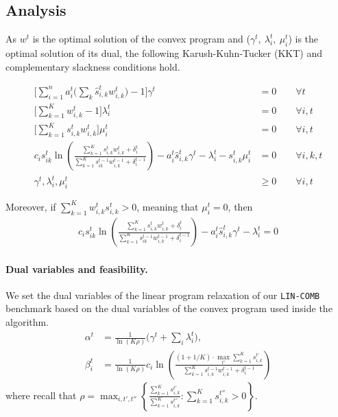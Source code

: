 \subsection{Analysis}
As $w^{t}$ is the optimal solution of the convex program and ($\gamma^t,\ \lambda_{i}^{t},\ \mu_{i}^{t}$) is the optimal solution of its dual, the following Karush-Kuhn-Tucker (KKT) and complementary slackness conditions hold.

\begin{align*}
   \biggl[ \sum_{i=1}^{n} a_{i}^{t} \biggl( \sum_{k}  \hat{s}_{i,k}^{t} w_{i,k}^{t} \biggr) - 1 \biggr] \gamma^{t} &= 0 \qquad \forall t \\
   \biggl[ \sum_{k=1}^{K}  w_{i,k}^{t}  - 1 \biggr] \lambda_{i}^{t} &= 0 \qquad \forall i, t \\
   \biggl[ \sum_{k=1}^{K}  s_{i,k}^{t} w_{i,k}^{t} \biggr] \mu_{i}^{t} &= 0 \qquad \forall i, t \\
%
 c_{i} s_{ik}^{t} \ln \left( \frac{\sum_{k=1}^{K} s_{i,k}^{t} w_{i,k}^{t} + \delta_{i}^{t}}{\sum_{k=1}^{K}  s_{ik}^{t-1}w_{i,k}^{t-1}  + \delta_{i}^{t-1}} \right)
    	- a_{i}^{t} \hat{s}_{i,k}^{t} \gamma^{t} - \lambda_{i}^{t} - s_{i,k}^{t} \mu_{i}^{t} &= 0	\qquad \forall i,k,t \\
	\gamma^{t}, \lambda_{i}^{t}, \mu_{i}^{t} &\geq 0 \qquad \forall i, t
\end{align*}

Moreover, if $\sum_{k=1}^{K} w_{i,k}^{t} s_{i,k}^{t} > 0$, meaning that $\mu_{i}^{t} = 0$, then
\begin{align}	\label{eq:KKT}
   c_{i} s_{ik}^{t} \ln \left( \frac{\sum_{k=1}^{K} s_{i,k}^{t} w_{i,k}^{t}  + \delta_{i}^{t}}{\sum_{k=1}^{K}  s_{ik}^{t-1}w_{i,k}^{t-1}  + \delta_{i}^{t-1}} \right)
    	- a_{i}^{t} \hat{s}_{i,k}^{t} \gamma^{t} - \lambda_{i}^{t} = 0
\end{align}


\paragraph{Dual variables and feasibility.} We set the dual variables of the linear program relaxation of our \texttt{LIN-COMB} benchmark based on the dual variables of the convex program used inside the algorithm.
%
\begin{align*}
    \alpha^{t} &= \frac{1}{\ln(K\rho)}  \biggl( \gamma^{t} + \sum_{i} \lambda_{i}^{t} \biggr), \\
    \beta_{i}^{t} &= \frac{1}{\ln(K\rho)} c_i \ln \left(\frac{ (1 + 1/K) \cdot \max_{t'} \sum_{k=1}^{K} s_{i,k}^{t'}}{\sum_{k=1}^{K}  s_{i,k}^{t-1} w_{i,k}^{t-1} + \delta_{i}^{t-1}}\right)
\end{align*}
%
where recall that $\rho = \max_{i, t',t''} \left\{\frac{\sum_{k=1}^{K} s_{i,k}^{t'}}{\sum_{k=1}^{K} s_{i,k}^{t''}} : \sum_{k=1}^{K} s_{i,k}^{t''} > 0 \right\}$.

